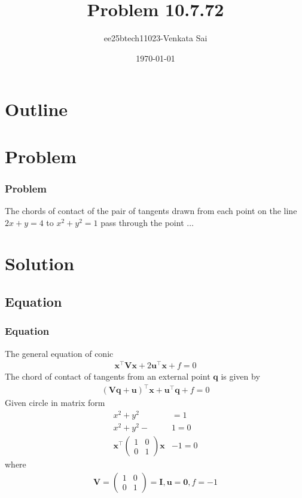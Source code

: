 \documentclass{beamer}
\title{Problem 10.7.72}
\author{ee25btech11023-Venkata Sai}
\date{\today}
\providecommand{\brak}[1]{\ensuremath{\left(#1\right)}}
\theoremstyle{remark}
\newcommand{\myvec}[1]{\ensuremath{\begin{pmatrix}#1\end{pmatrix}}}
\let\vec\mathbf
\numberwithin{equation}{section}
\begin{document}
\begin{frame}
\titlepage
\end{frame}

\section*{Outline}
\begin{frame}
\tableofcontents
\end{frame}

\section{Problem}

\begin{frame}
\frametitle{Problem}
The chords of contact of the pair of tangents drawn from each point on the line
$2x + y = 4$ to $x^2 + y^2 = 1 $ pass through the point $\dots$
\end{frame}
\section{Solution}

 
\subsection{Equation}
\begin{frame}
\frametitle{Equation}
The general equation of conic
\begin{align}
    \vec{x}^\top\vec{V}\vec{x} + 2\vec{u}^\top\vec{x} + f = 0
\end{align}
The chord of contact of tangents from an external point $\vec{q}$ is given by
\begin{align}
 \brak{\vec{V}\vec{q}+\vec{u}}^\top\vec{x}+\vec{u}^\top\vec{q}+f=0
\end{align}
Given circle in matrix form
\begin{align}
x^2 + y^2 &= 1  \\
x^2 + y^2 - &1=0 \\
\vec{x}^\top\myvec{1 &0 \\0 &1}\vec{x}&-1=0
\end{align}
where
\begin{align}
\vec{V}=\myvec{1&0\\0&1}=\vec{I},\vec{u}=\vec{0},f=-1
\end{align}
\end{frame}
\end{document}
